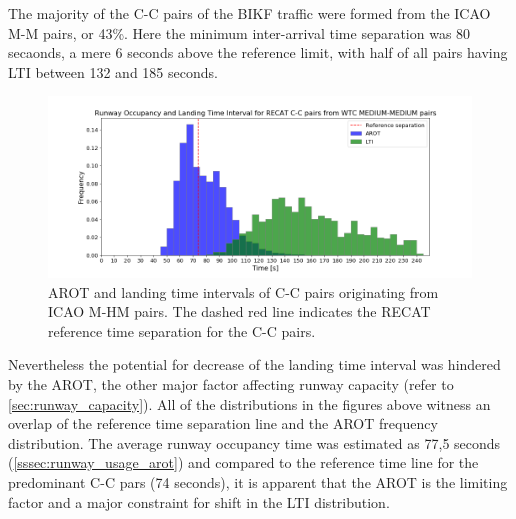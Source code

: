 The majority of the C-C pairs of the BIKF traffic were formed from the ICAO M-M pairs, or 43\%. Here the minimum inter-arrival time separation was 80 secaonds, a mere 6 seconds above the reference limit, with half of all pairs having LTI between 132 and 185 seconds.
\begin{figure}[h]
    \centering
    \includegraphics[width=1\textwidth]{graphics/fig_CC_from_MM_pairs_time_sep.png}
    \caption[AROT and LTI of C-C pairs originating from ICAO M-M pairs]{AROT and landing time intervals of C-C pairs originating from ICAO M-HM pairs. The dashed red line indicates the RECAT reference time separation for the C-C pairs.}
    \label{fig:CC_from_MM_pairs_time_sep}
\end{figure}
Nevertheless the potential for decrease of the landing time interval was hindered by the AROT, the other major factor affecting runway capacity (refer to \ref{sec:runway_capacity}). All of the distributions in the figures above witness an overlap of the reference time separation line and the AROT frequency distribution. The average runway occupancy time was estimated as 77,5 seconds (\ref{sssec:runway_usage_arot}) and compared to the reference time line for the predominant C-C pars (74 seconds), it is apparent that the AROT is the limiting factor and a major constraint for shift in the LTI distribution.









